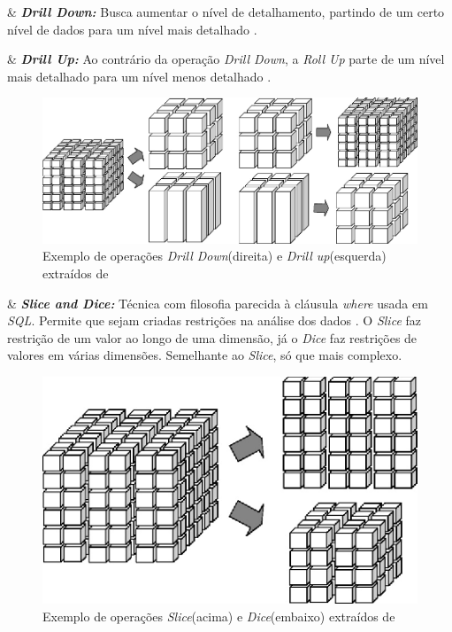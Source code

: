 \begin{easylist}[itemize]

	& \textbf{\textit{Drill Down:}} Busca aumentar o nível de detalhamento, partindo de um certo nível de dados para um nível mais detalhado \cite{neeraj_sharma_2011}.  
	
	& \textbf{\textit{Drill Up:}} Ao contrário da operação \textit{Drill Down}, a \textit{Roll Up} parte de um nível mais detalhado para um nível menos detalhado  \cite{neeraj_sharma_2011}.\\
	
	
	\begin{figure}[h!]
\centering
\includegraphics[keepaspectratio=false,scale=1.3]{figuras/figuras_nilton/drillDownUp.eps}
\caption{Exemplo de operações \textit{Drill Down}(direita) e \textit{Drill up}(esquerda) extraídos de }
\label{fig:drillUpDown}
\end{figure}
\FloatBarrier
	
	& \textbf{\textit{Slice and Dice:}} Técnica com filosofia parecida à cláusula \textit{where} usada em \textit{SQL}. Permite que sejam criadas restrições na análise dos dados \cite{valeria2012}. O \textit{Slice} faz restrição de um valor ao longo de uma dimensão, já o \textit{Dice} faz restrições de valores em várias dimensões. Semelhante ao \textit{Slice}, só que mais complexo.\\
	
	
		\begin{figure}[h!]
\centering
\includegraphics[keepaspectratio=false,scale=2.0]{figuras/figuras_nilton/sliceDice.eps}
\caption{Exemplo de operações \textit{Slice}(acima) e \textit{Dice}(embaixo) extraídos de }
\label{fig:sliceDice}
\end{figure}
\FloatBarrier
	

\end{easylist}
